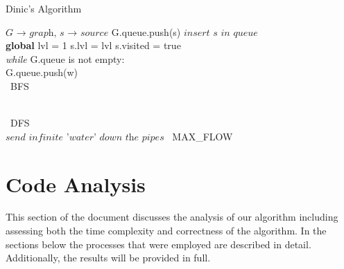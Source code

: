 \documentclass{report}
\begin{document}
\begin{algorithm}
\caption{Dinic's Algorithm}
\begin{algorithmic}[1]
 $\textit{G → graph, s → source}$
\State G.queue.push(s) $\textit{insert s in queue}$\\
\State \textbf{global} lvl = 1
\State s.lvl = lvl
\State s.visited = true\\
\BState \emph{while} G.queue is not empty:
\\
\State G.queue.push(w)
\EndIf\\
\EndProcedure\ {BFS}\\
\end{algorithmic}
\end{algorithm}

\begin{algorithm}
\begin{algorithmic}
\EndIf\\

\EndIf
\EndIf
{}
\EndProcedure\ {DFS}\\

 $\textit{send infinite 'water' down the pipes}$
\EndIf
{}
\EndProcedure\ MAX\_FLOW
\end{algorithmic}
\end{algorithm}



\chapter{Code Analysis}
This section of the document discusses the analysis of our algorithm including assessing both the time complexity and correctness of the algorithm. In the sections below the processes that were employed are described in detail. Additionally, the results will be provided in full.
\end{document}
